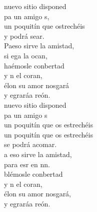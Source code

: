 \begin{cancion}%
	nuevo sitio disponed\\
	pa un amigo s,\\
	un poquitín que ostrechéis\\
	y podrá sear.\\
	Paeso sirve la amistad,\\
	si ega la ocan, \\
	haémosle conbertad\\
	y n el coran,\\
	élon su amor nosgará\\
	y egraráa reón.\\
	nuevo sitio disponed\\
	pa un amigo s\\
un poquitín que os estrechéis\\
un poquitín que os estrechéis\\
	se podrá acomar.\\
	a eso sirve la amistad,\\
	para esr en nn.\\
	blémosle conbertad\\
	y n el coran,\\
	élon su amor nosgará,\\
	y egraráa reón.\\
\end{cancion}%
